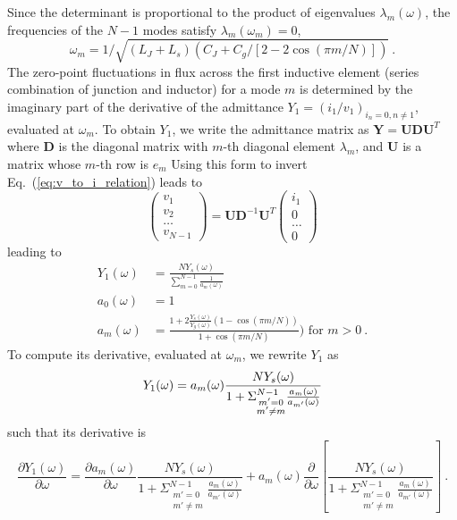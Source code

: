 %
Since the determinant is proportional to the product of eigenvalues $\lambda_m(\omega)$, the frequencies of the $N-1$ modes satisfy $\lambda_m(\omega_m) = 0$,
\begin{equation}
\omega_m = 1/\sqrt{(L_J+L_s)(C_J+C_g/\left[2-2\cos(\pi m/N)\right])}\ .
\end{equation}
The zero-point fluctuations in flux across the first inductive element (series combination of junction and inductor) for a mode $m$ is determined by the imaginary part of the derivative of the admittance $Y_1 = \left(i_1/v_1\right)_{i_n = 0, n\ne 1}$, evaluated at $\omega_m$.
%
To obtain $Y_1$, we write the admittance matrix as $\mathbf{Y} = \mathbf{U} \mathbf{D} \mathbf{U}^{T} $ where $  \mathbf{D} $ is the diagonal matrix with  $m$-th diagonal element $\lambda_m$,  and $ \mathbf{U}$ is a matrix whose $m$-th row is $e_m$
%
Using this form to invert Eq.~(\ref{eq:v_to_i_relation}) leads to
\begin{equation}
%
\left(
\begin{array}{c}
v_{1} \\
v_{2} \\
\dots\\
v_{N-1} 
\end{array}
\right)
=  
\mathbf{U} \mathbf{D}^{-1} \mathbf{U}^{T}
\left(
\begin{array}{c}
i_1\\
0\\
\dots\\
0
\end{array}
\right)
\end{equation}
leading to 
\begin{equation}
\begin{split}
Y_{1}(\omega)&=  \frac{N Y_s (\omega)}{\sum_{m=0}^{N-1}\frac{1}{a_m(\omega)}}\\
a_0(\omega) &= 1\\
a_{m}(\omega) &= \frac{1+2\frac{Y_s(\omega)}{Y_g(\omega)}(1 - \cos (\pi m/ N))}{ 1 + \cos (\pi m/ N) })\text{ for }m>0\ .
\end{split}
\end{equation}
To compute its derivative, evaluated at $\omega_m$, we rewrite $Y_1$ as
\begin{equation}
Y_{1}(\omega)=  a_m(\omega)\frac{N Y_s(\omega) }{1+\Sigma_{\substack{m'=0 \\ m'\ne m}}^{N-1}\frac{a_m(\omega)}{a_{m'}(\omega)}}\\
\end{equation}
such that its derivative is 
\begin{equation}
\frac{\partial Y_{1}(\omega)}{\partial\omega}=  \frac{\partial a_m(\omega)}{\partial\omega}\frac{N Y_s(\omega) }{1+\Sigma_{\substack{m'=0 \\ m'\ne m}}^{N-1}\frac{a_m(\omega)}{a_{m'}(\omega)}}+ a_m(\omega)\frac{\partial }{\partial\omega}\left[\frac{N Y_s(\omega) }{1+\Sigma_{\substack{m'=0 \\ m'\ne m}}^{N-1}\frac{a_m(\omega)}{a_{m'}(\omega)}}\right]\ .
\end{equation}

